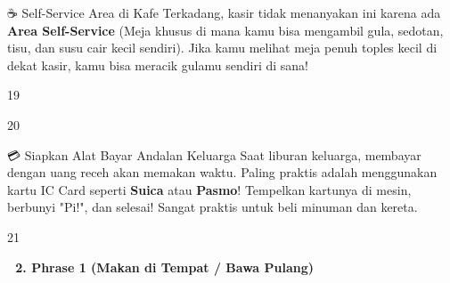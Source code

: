 \begin{lessonbox}{☕ Self-Service Area di Kafe}
    Terkadang, kasir tidak menanyakan ini karena ada \textbf{Area Self-Service} (Meja khusus di mana kamu bisa mengambil gula, sedotan, tisu, dan susu cair kecil sendiri). Jika kamu melihat meja penuh toples kecil di dekat kasir, kamu bisa meracik gulamu sendiri di sana!
\end{lessonbox}

\begin{convobox}{19}
    \noindent

    \vspace{1.5em}
\end{convobox}

\begin{convobox}{20}
    \noindent

    \vspace{1.5em}
\end{convobox}

\begin{lessonbox}{💳 Siapkan Alat Bayar Andalan Keluarga}
    Saat liburan keluarga, membayar dengan uang receh akan memakan waktu. Paling praktis adalah menggunakan kartu IC Card seperti \textbf{Suica} atau \textbf{Pasmo}! Tempelkan kartunya di mesin, berbunyi "Pi!", dan selesai! Sangat praktis untuk beli minuman dan kereta.
\end{lessonbox}

\begin{convobox}{21}
    \noindent
      
     

    \vspace{1.5em}
\end{convobox}

\vspace{1em}
\begin{tcolorbox}[colback=boxframe, colframe=boxframe, rounded corners, boxrule=0pt, arc=3mm, left=2mm, top=2mm, bottom=2mm]
    \Large \bfseries \color{white} 🍰 2. Phrase 1 (Makan di Tempat / Bawa Pulang)
\end{tcolorbox}
\vspace{1em}

